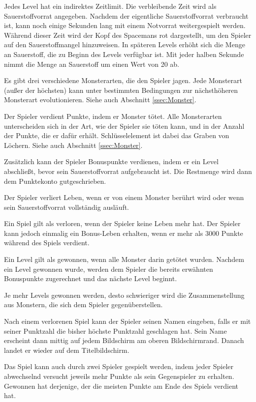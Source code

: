 \documentclass[12pt]{article}
\begin{document}
	Jedes Level hat ein indirektes Zeitlimit. Die verbleibende Zeit wird als Sauerstoffvorrat angegeben. Nachdem der eigentliche Sauerstoffvorrat verbraucht ist, kann noch einige Sekunden lang mit einem Notvorrat weitergespielt werden. Während dieser Zeit wird der Kopf des Spacemans rot dargestellt, um den Spieler auf den Sauerstoffmangel hinzuweisen. In späteren Levels erhöht sich die Menge an Sauerstoff, die zu Beginn des Levels verfügbar ist. Mit jeder halben Sekunde nimmt die Menge an Sauerstoff um einen Wert von 20 ab.
    
	Es gibt drei verschiedene Monsterarten, die den Spieler jagen. Jede Monsterart (außer der höchsten) kann unter bestimmten Bedingungen zur nächsthöheren Monsterart evolutionieren. Siehe auch Abschnitt \ref{ssec:Monster}. 
    
    Der Spieler verdient Punkte, indem er Monster tötet. Alle Monsterarten unterscheiden sich in der Art, wie der Spieler sie töten kann, und in der Anzahl der Punkte, die er dafür erhält. Schlüsselelement ist dabei das Graben von Löchern. Siehe auch Abschnitt \ref{ssec:Monster}.
    
    Zusätzlich kann der Spieler Bonuspunkte verdienen, indem er ein Level abschließt, bevor sein Sauerstoffvorrat aufgebraucht ist. Die Restmenge wird dann dem Punktekonto gutgeschrieben.
    
    Der Spieler verliert Leben, wenn er von einem Monster berührt wird oder wenn sein Sauerstoffvorrat vollständig ausläuft.
    
    Ein Spiel gilt als verloren, wenn der Spieler keine Leben mehr hat. Der Spieler kann jedoch einmalig ein Bonus-Leben erhalten, wenn er mehr als 3000 Punkte während des Spiels verdient. 
    
    Ein Level gilt als gewonnen, wenn alle Monster darin getötet wurden. Nachdem ein Level gewonnen wurde, werden dem Spieler die bereits erwähnten Bonuspunkte zugerechnet und das nächste Level beginnt.
    
    Je mehr Levels gewonnen werden, desto schwieriger wird die Zusammenstellung aus Monstern, die sich dem Spieler gegenüberstellen.
    
    Nach einem verlorenen Spiel kann der Spieler seinen Namen eingeben, falls er mit seiner Punktzahl die bisher höchste Punktzahl geschlagen hat. Sein Name erscheint dann mittig auf jedem Bildschirm am oberen Bildschirmrand. Danach landet er wieder auf dem Titelbildschirm.
    
    Das Spiel kann auch durch zwei Spieler gespielt werden, indem jeder Spieler abwechselnd versucht jeweils mehr Punkte als sein Gegenspieler zu erhalten. Gewonnen hat derjenige, der die meisten Punkte am Ende des Spiels verdient hat.
    
\end{document}
